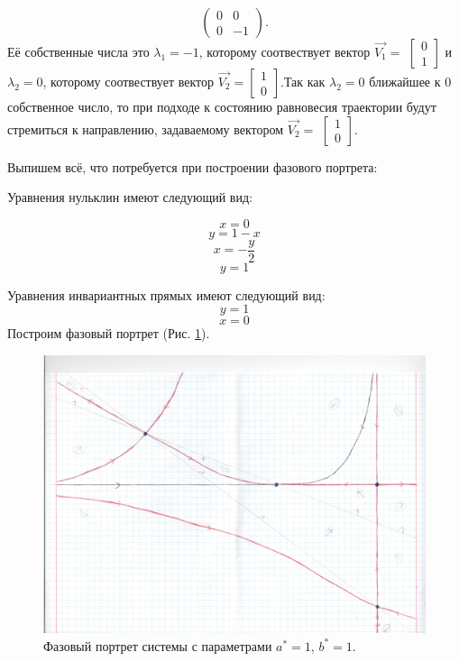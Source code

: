 \begin{itemize}
{		$$\begin{pmatrix}0 & 0\\0 & -1\end{pmatrix}. $$Её собственные числа это $\lambda_1=-1$, которому соотвествует вектор $\Vec{V_1}=$ $\left[\begin{matrix}0\\1\end{matrix}\right]$ и $\lambda_2=0$, которому соотвествует вектор $\Vec{V_2}=$$\left[\begin{matrix}1\\0\end{matrix}\right]$.Так как $\lambda_2=0$ ближайшее к $0$ собственное число, то при подходе к состоянию равновесия траектории будут стремиться к направлению, задаваемому вектором $\Vec{V_2}=$ $\left[\begin{matrix}1\\0\end{matrix}\right]$.}
\end{itemize} 

Выпишем всё, что потребуется при построении фазового портрета:

Уравнения нульклин имеют следующий вид: 

$$x=0$$
$$y=1 - x$$
$$x=- \frac{y}{2}$$
$$y=1$$


Уравнения инвариантных прямых имеют следующий вид: 
$$y = 1$$
$$x = 0$$
Построим фазовый портрет (Рис. \ref{fig:phportr21}).

\begin{figure}[h]
	
	\includegraphics[width=\textwidth]{phptr/(16, 12).jpg}
	\centering
	\caption{\label{fig:phportr21} Фазовый портрет системы с параметрами $a^\ast = 1$, $b^\ast = 1$.}
	
\end{figure}

